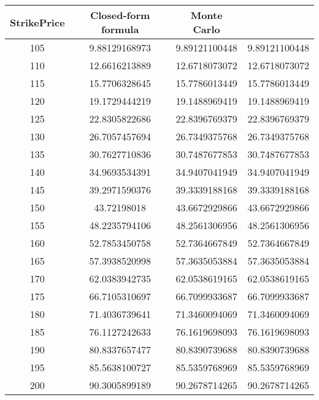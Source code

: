 \begin{center}
\begin{tabular}{|c|c|c|c|}
\hline
StrikePrice & Closed-form formula & Monte Carlo\\
\hline
105&9.88129168973 &9.89121100448 & 9.89121100448 \\
110&12.6616213889 &12.6718073072 & 12.6718073072 \\
115&15.7706328645 &15.7786013449 & 15.7786013449 \\
120&19.1729444219 &19.1488969419 & 19.1488969419 \\
125&22.8305822686 &22.8396769379 & 22.8396769379 \\
130&26.7057457694 &26.7349375768 & 26.7349375768 \\
135&30.7627710836 &30.7487677853 & 30.7487677853 \\
140&34.9693534391 &34.9407041949 & 34.9407041949 \\
145&39.2971590376 &39.3339188168 & 39.3339188168 \\
150&43.72198018 &  43.6672929866 & 43.6672929866 \\
155&48.2235794106 &48.2561306956 & 48.2561306956 \\
160&52.7853450758 &52.7364667849 & 52.7364667849 \\
165&57.3938520998 &57.3635053884 & 57.3635053884 \\
170&62.0383942735 &62.0538619165 & 62.0538619165 \\
175&66.7105310697 &66.7099933687 & 66.7099933687 \\
180&71.4036739641 &71.3460094069 & 71.3460094069 \\
185&76.1127242633 &76.1619698093 & 76.1619698093 \\
190&80.8337657477 &80.8390739688 & 80.8390739688 \\
195&85.5638100727 &85.5359768969 & 85.5359768969 \\
200&90.3005899189 &90.2678714265 & 90.2678714265 \\
\hline
\end{tabular}
\end{center}
\newpage

